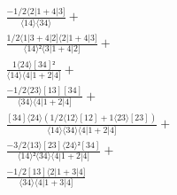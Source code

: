 \documentclass[varwidth, border=5pt]{standalone}
\begin{document}
\begin{my}
$\begin{gathered}
\scriptscriptstyle\frac{-1/2⟨2|1+4|3]}{⟨14⟩⟨34⟩} +\\
\scriptscriptstyle\frac{1/2⟨1|3+4|2]⟨2|1+4|3]}{⟨14⟩²⟨3|1+4|2]} +\\
\scriptscriptstyle\frac{1⟨24⟩[34]²}{⟨14⟩⟨4|1+2|4]} +\\
\scriptscriptstyle\frac{-1/2⟨23⟩[13][34]}{⟨34⟩⟨4|1+2|4]} +\\
\scriptscriptstyle\frac{[34]⟨24⟩(1/2⟨12⟩[12]+1⟨23⟩[23])}{⟨14⟩⟨34⟩⟨4|1+2|4]} +\\
\scriptscriptstyle\frac{-3/2⟨13⟩[23]⟨24⟩²[34]}{⟨14⟩²⟨34⟩⟨4|1+2|4]} +\\
\scriptscriptstyle\frac{-1/2[13]⟨2|1+3|4]}{⟨34⟩⟨4|1+3|4]} \phantom{+}
\end{gathered}$
\end{my}
\end{document}

